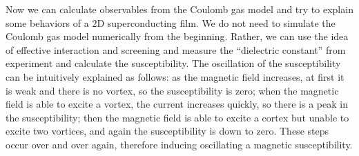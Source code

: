 \documentclass[hyperref, a4paper]{article}
\begin{document}
Now we can calculate observables from the Coulomb gas model and try to explain some behaviors of a 2D 
superconducting film. We do not need to simulate the Coulomb gas model numerically from the beginning.
Rather, we can use the idea of effective interaction and screening and measure the ``dielectric constant''
from experiment and calculate the susceptibility. The oscillation of the susceptibility can be intuitively 
explained as follows: as the magnetic field increases, at first it is weak and there is no vortex, so 
the susceptibility is zero; when the magnetic field is able to excite a vortex, the current increases quickly,
so there is a peak in the susceptibility; then the magnetic field is able to excite a cortex but unable to 
excite two vortices, and again the susceptibility is down to zero. These steps occur over and over again,
therefore inducing oscillating a magnetic susceptibility.
\end{document}
